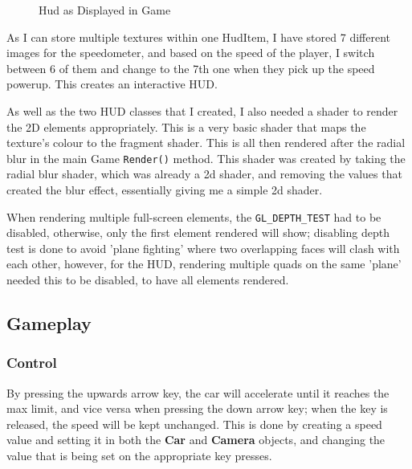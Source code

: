 \documentclass[11pt]{report}
\begin{document}
\begin{figure}[H]
    \centering
    \caption{Hud as Displayed in Game}
\end{figure}

As I can store multiple textures within one HudItem, I have stored 7 different images for the speedometer, and based on the speed of the player, I switch between 6 of them and change to the 7th one when they pick up the speed powerup. This creates an interactive HUD.

As well as the two HUD classes that I created, I also needed a shader to render the 2D elements appropriately. This is a very basic shader that maps the texture's colour to the fragment shader. This is all then rendered after the radial blur in the main Game \colorbox{mygrey}{\lstinline{Render()}} method. This shader was created by taking the radial blur shader, which was already a 2d shader, and removing the values that created the blur effect, essentially giving me a simple 2d shader.

When rendering multiple full-screen elements, the \colorbox{mygrey}{\lstinline{GL_DEPTH_TEST}} had to be disabled, otherwise, only the first element rendered will show; disabling depth test is done to avoid 'plane fighting' where two overlapping faces will clash with each other, however, for the HUD, rendering multiple quads on the same 'plane' needed this to be disabled, to have all elements rendered.

\subsection*{Gameplay}
\subsubsection*{Control}
By pressing the upwards arrow key, the car will accelerate until it reaches the max limit, and vice versa when pressing the down arrow key; when the key is released, the speed will be kept unchanged. This is done by creating a speed value and setting it in both the \textbf{Car} and \textbf{Camera} objects, and changing the value that is being set on the appropriate key presses.
\end{document}
